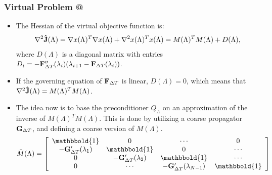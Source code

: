 \documentclass[9pt]{beamer}
\makeatletter
\newcommand*{\rom}[1]{\expandafter\@slowromancap\romannumeral #1@}
\makeatother
\begin{document}
\begin{frame}
\frametitle{Virtual Problem \rom{2}}
\begin{itemize}
\item{The Hessian of the virtual objective function is:
{\small
\begin{align*}
\nabla^2 \bold{\hat J}(\Lambda)= \nabla x(\Lambda)^T \nabla x(\Lambda) + \nabla^2 x(\Lambda)^Tx(\Lambda) = M(\Lambda)^TM(\Lambda) + D(\Lambda),
\end{align*}}
where {\tiny$D(\Lambda)$} is a diagonal matrix with entries {\tiny$D_i=-\bold{F}_{\Delta T}''(\lambda_i)(\lambda_{i+1}-\bold F_{\Delta T}(\lambda_i))$}.}
\item{If the governing equation of {\tiny$\bold F_{\Delta T}$} is linear, {\tiny$D(\Lambda)=0$}, which means that {\tiny$\nabla^2 \bold{\hat J}(\Lambda)= M(\Lambda)^TM(\Lambda)$}.}
\item{The idea now is to base the preconditioner $Q_{\Lambda}$ on an approximation of the inverse of {\tiny$M(\Lambda)^TM(\Lambda)$}. This is done by utilizing a coarse propagator {\tiny$\bold{G}_{\Delta T}$}, and defining a coarse version of $M(\Lambda)$.
{\tiny
\begin{align*}
\bar M(\Lambda)= \left[ \begin{array}{cccc}
   \mathbbold{1} & 0 & \cdots & 0 \\  
   -\bold{G}_{\Delta T}'(\lambda_{1}) & \mathbbold{1} & 0 & \cdots \\ 
   0 &-\bold{G}_{\Delta T}'(\lambda_{2}) & \mathbbold{1}  & \cdots \\
   0 &\cdots &-\bold{G}_{\Delta T}'(\lambda_{N-1}) & \mathbbold{1}  \\
   \end{array}  \right]
\end{align*}}}
\end{itemize}
\end{frame}
\end{document}
